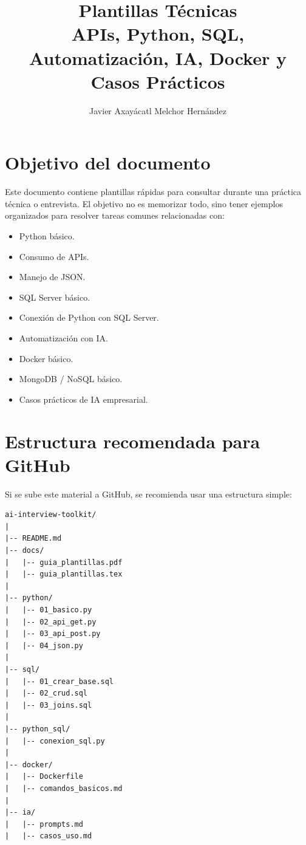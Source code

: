 \documentclass[12pt]{article}
\title{\textbf{Plantillas Técnicas}\\
\large APIs, Python, SQL, Automatización, IA, Docker y Casos Prácticos}
\author{Javier Axayácatl Melchor Hernández}
\date{}
\begin{document}
\maketitle
\tableofcontents
\newpage

\section{Objetivo del documento}

Este documento contiene plantillas rápidas para consultar durante una práctica técnica o entrevista. 
El objetivo no es memorizar todo, sino tener ejemplos organizados para resolver tareas comunes relacionadas con:

\begin{itemize}
    \item Python básico.
    \item Consumo de APIs.
    \item Manejo de JSON.
    \item SQL Server básico.
    \item Conexión de Python con SQL Server.
    \item Automatización con IA.
    \item Docker básico.
    \item MongoDB / NoSQL básico.
    \item Casos prácticos de IA empresarial.
\end{itemize}

\section{Estructura recomendada para GitHub}

Si se sube este material a GitHub, se recomienda usar una estructura simple:

\begin{lstlisting}
ai-interview-toolkit/
|
|-- README.md
|-- docs/
|   |-- guia_plantillas.pdf
|   |-- guia_plantillas.tex
|
|-- python/
|   |-- 01_basico.py
|   |-- 02_api_get.py
|   |-- 03_api_post.py
|   |-- 04_json.py
|
|-- sql/
|   |-- 01_crear_base.sql
|   |-- 02_crud.sql
|   |-- 03_joins.sql
|
|-- python_sql/
|   |-- conexion_sql.py
|
|-- docker/
|   |-- Dockerfile
|   |-- comandos_basicos.md
|
|-- ia/
|   |-- prompts.md
|   |-- casos_uso.md
\end{lstlisting}
\end{document}
